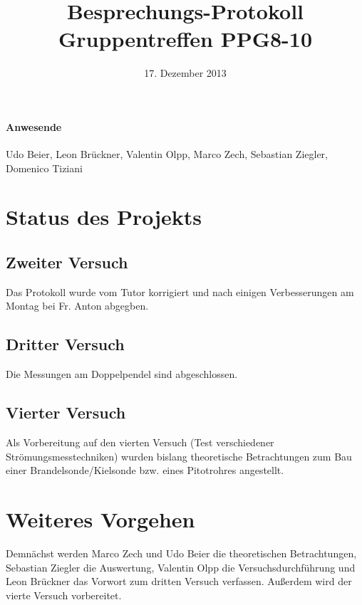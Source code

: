 \documentclass[
]{scrartcl}
\begin{document}
\title{Besprechungs-Protokoll Gruppentreffen PPG8-10}
\date{17. Dezember 2013}
\maketitle

\paragraph*{Anwesende}
Udo Beier,
Leon Brückner,
Valentin Olpp,
Marco Zech,
Sebastian Ziegler,
Domenico Tiziani


\section{Status des Projekts}

\subsection{Zweiter Versuch}
Das Protokoll wurde vom Tutor korrigiert und nach einigen Verbesserungen am Montag bei Fr. Anton abgegben.

\subsection{Dritter Versuch}
Die Messungen am Doppelpendel sind abgeschlossen.

\subsection{Vierter Versuch}
Als Vorbereitung auf den vierten Versuch (Test verschiedener Strömungsmesstechniken) wurden bislang theoretische Betrachtungen zum Bau einer Brandelsonde/Kielsonde bzw. eines Pitotrohres angestellt.

\section{Weiteres Vorgehen}
Demnächst werden Marco Zech und Udo Beier die theoretischen Betrachtungen, Sebastian Ziegler die Auswertung, Valentin Olpp die Versuchsdurchführung und Leon Brückner das Vorwort zum dritten Versuch verfassen.
Außerdem wird der vierte Versuch vorbereitet.
\end{document}
